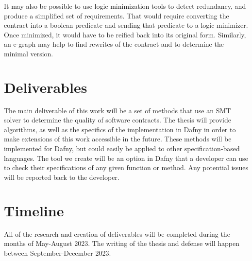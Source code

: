 \documentclass{article}
\begin{document}
It may also be possible to use logic minimization tools to detect redundancy, and produce a simplified set of requirements. That would require 
converting the contract into a boolean predicate and sending that predicate to a logic minimizer. Once minimized, it would have to be reified back 
into its original form. Similarly, an e-graph may help to find rewrites of the contract and to determine the minimal version. 

\section{Deliverables}

The main deliverable of this work will be a set of methods that use an SMT solver to determine the quality of software
contracts. The thesis will provide algorithms, as well as the specifics of the implementation in Dafny in order to make
extensions of this work accessible in the future. These methods will be implemented for Dafny, but could easily be
applied to other specification-based languages. The tool we create will be an option in Dafny that a developer can
use to check their specifications of any given function or method. Any potential issues will be reported back to the
developer.

\section{Timeline}

All of the research and creation of deliverables will be completed during the months of May-August 2023. The writing of the thesis and defense will happen between September-December 2023.

% 
% 
% 

\end{document}
